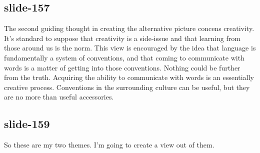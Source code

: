 \documentclass[12pt,\papersize]{extarticle}
\begin{document}
 
\subsection{slide-157}
The second guiding thought in creating the alternative picture concens creativity.
It's standard to suppose that creativity is a side-issue and that learning from those around us is the norm.
This view is encouraged by the idea that language is fundamentally a system of conventions, and that coming to communicate with words is a matter of getting into those conventions.
Nothing could be further from the truth.
Acquiring the ability to communicate with words is an essentially creative process.
Conventions in the surrounding culture can be useful, but they are no more than useful accessories.
 
 
\subsection{slide-159}
So these are my two themes.
I'm going to create a view out of them.


 






\end{document}
